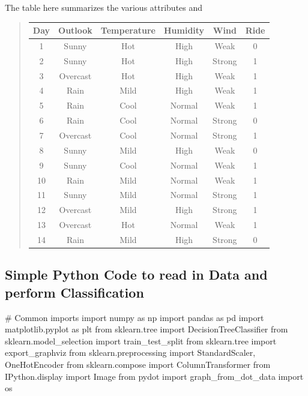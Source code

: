 \documentclass[%
oneside,                 %
final,                   %
10pt]{article}
\begin{document}
The table here summarizes the various attributes and

\begin{quote}
\begin{tabular}{cccccc}
\hline
\multicolumn{1}{c}{ Day } & \multicolumn{1}{c}{ Outlook } & \multicolumn{1}{c}{ Temperature } & \multicolumn{1}{c}{ Humidity } & \multicolumn{1}{c}{ Wind } & \multicolumn{1}{c}{ Ride } \\
\hline
1   & Sunny    & Hot         & High     & Weak   & 0    \\
2   & Sunny    & Hot         & High     & Strong & 1    \\
3   & Overcast & Hot         & High     & Weak   & 1    \\
4   & Rain     & Mild        & High     & Weak   & 1    \\
5   & Rain     & Cool        & Normal   & Weak   & 1    \\
6   & Rain     & Cool        & Normal   & Strong & 0    \\
7   & Overcast & Cool        & Normal   & Strong & 1    \\
8   & Sunny    & Mild        & High     & Weak   & 0    \\
9   & Sunny    & Cool        & Normal   & Weak   & 1    \\
10  & Rain     & Mild        & Normal   & Weak   & 1    \\
11  & Sunny    & Mild        & Normal   & Strong & 1    \\
12  & Overcast & Mild        & High     & Strong & 1    \\
13  & Overcast & Hot         & Normal   & Weak   & 1    \\
14  & Rain     & Mild        & High     & Strong & 0    \\
\hline
\end{tabular}
\end{quote}

\noindent

\subsection{Simple Python Code to read in Data and perform Classification}

\bpycod
# Common imports
import numpy as np
import pandas as pd
import matplotlib.pyplot as plt
from sklearn.tree import DecisionTreeClassifier
from sklearn.model_selection import train_test_split
from sklearn.tree import export_graphviz
from sklearn.preprocessing import StandardScaler, OneHotEncoder
from sklearn.compose import ColumnTransformer
from IPython.display import Image 
from pydot import graph_from_dot_data
import os
\end{document}
